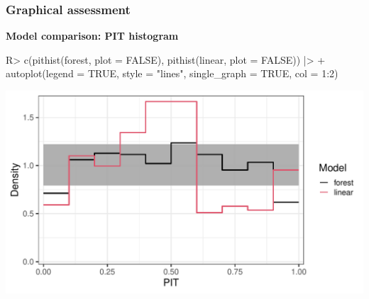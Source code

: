 \documentclass[11pt,t,usepdftitle=false,aspectratio=169]{beamer}
\begin{document}
\begin{frame}[fragile]
\addtocounter{framenumber}{-1}
\frametitle{Graphical assessment}

\vspace{-0.75em}

\textbf{Model comparison: PIT histogram}

\vspace{0.5em}

\begin{Schunk}
\begin{Sinput}
R> c(pithist(forest, plot = FALSE), pithist(linear, plot = FALSE)) |>
+    autoplot(legend = TRUE, style = "lines", single_graph = TRUE, col = 1:2)
\end{Sinput}
\end{Schunk}

\begin{center}
\includegraphics{slides-rain_topmodels_lm_pithist2}
\end{center}

\end{frame}
\end{document}
